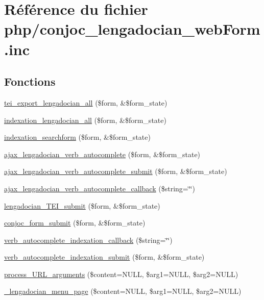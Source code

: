 \hypertarget{php_2conjoc__lengadocian__web_form_8inc}{}\section{Référence du fichier php/conjoc\+\_\+lengadocian\+\_\+web\+Form.inc}
\label{php_2conjoc__lengadocian__web_form_8inc}
\subsection*{Fonctions}
\begin{DoxyCompactItemize}
\item 
\hyperlink{php_2conjoc__lengadocian__web_form_8inc_a9c7725a828c1a44761bc51fe7a346215}{tei\+\_\+export\+\_\+lengadocian\+\_\+all} (\$form, \&\$form\+\_\+state)
\item 
\hyperlink{php_2conjoc__lengadocian__web_form_8inc_a465cce16b0d09f364ccb546c46c82306}{indexation\+\_\+lengadocian\+\_\+all} (\$form, \&\$form\+\_\+state)
\item 
\hyperlink{php_2conjoc__lengadocian__web_form_8inc_a3f7b0b4a8f4301190850532d5488c54a}{indexation\+\_\+searchform} (\$form, \&\$form\+\_\+state)
\item 
\hyperlink{php_2conjoc__lengadocian__web_form_8inc_a95265729a90a0b79d7d98483fce78880}{ajax\+\_\+lengadocian\+\_\+verb\+\_\+autocomplete} (\$form, \&\$form\+\_\+state)
\item 
\hyperlink{php_2conjoc__lengadocian__web_form_8inc_a2206d720f533b7b1afa6ac0568e740ef}{ajax\+\_\+lengadocian\+\_\+verb\+\_\+autocomplete\+\_\+submit} (\$form, \&\$form\+\_\+state)
\item 
\hyperlink{php_2conjoc__lengadocian__web_form_8inc_a26cea88ddc504d14492fa9fd58a060b4}{ajax\+\_\+lengadocian\+\_\+verb\+\_\+autocomplete\+\_\+callback} (\$string=\char`\"{}\char`\"{})
\item 
\hyperlink{php_2conjoc__lengadocian__web_form_8inc_a704a4de756f6a38064970e97d4a2bc6c}{lengadocian\+\_\+\+T\+E\+I\+\_\+submit} (\$form, \&\$form\+\_\+state)
\item 
\hyperlink{php_2conjoc__lengadocian__web_form_8inc_ad10d751f3d75ba568eb1f41bd43fcc94}{conjoc\+\_\+form\+\_\+submit} (\$form, \&\$form\+\_\+state)
\item 
\hyperlink{php_2conjoc__lengadocian__web_form_8inc_a378d4601a46c698692d26cb301470598}{verb\+\_\+autocomplete\+\_\+indexation\+\_\+callback} (\$string=\char`\"{}\char`\"{})
\item 
\hyperlink{php_2conjoc__lengadocian__web_form_8inc_a5e7b0be9cab73b5b2be66499afd0edc5}{verb\+\_\+autocomplete\+\_\+indexation\+\_\+submit} (\$form, \&\$form\+\_\+state)
\item 
\hyperlink{php_2conjoc__lengadocian__web_form_8inc_afecc813b5558b906fe6cc9adb1419c35}{process\+\_\+\+U\+R\+L\+\_\+arguments} (\$content=N\+U\+LL, \$arg1=N\+U\+LL, \$arg2=N\+U\+LL)
\item 
\hyperlink{php_2conjoc__lengadocian__web_form_8inc_a4ffe99e612db8d794975a33aefb781f7}{\+\_\+lengadocian\+\_\+menu\+\_\+page} (\$content=N\+U\+LL, \$arg1=N\+U\+LL, \$arg2=N\+U\+LL)
\end{DoxyCompactItemize}


